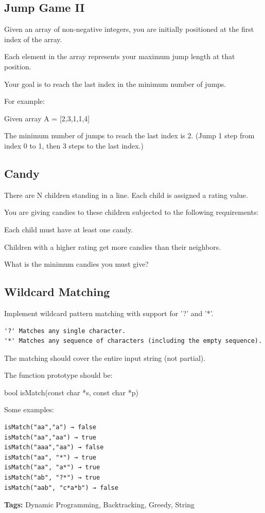 \documentclass[12pt]{book}
\begin{document}
\subsection{Jump Game II}
\label{sec-13-2-1}
Given an array of non-negative integers, you are initially positioned at the first index of the array.

Each element in the array represents your maximum jump length at that position.

Your goal is to reach the last index in the minimum number of jumps.

For example:

Given array A = [2,3,1,1,4]

The minimum number of jumps to reach the last index is 2. (Jump 1 step from index 0 to 1, then 3 steps to the last index.)
\subsection{Candy}
\label{sec-13-2-2}
There are N children standing in a line. Each child is assigned a rating value.

You are giving candies to these children subjected to the following requirements:

Each child must have at least one candy.

Children with a higher rating get more candies than their neighbors.

What is the minimum candies you must give?
\subsection{Wildcard Matching}
\label{sec-13-2-3}
Implement wildcard pattern matching with support for '?' and '*'.
\lstset{language=java,label= ,caption= ,numbers=none}
\begin{lstlisting}
'?' Matches any single character.
'*' Matches any sequence of characters (including the empty sequence).
\end{lstlisting}

The matching should cover the entire input string (not partial).

The function prototype should be:

bool isMatch(const char *s, const char *p)

Some examples:
\lstset{language=java,label= ,caption= ,numbers=none}
\begin{lstlisting}
isMatch("aa","a") → false
isMatch("aa","aa") → true
isMatch("aaa","aa") → false
isMatch("aa", "*") → true
isMatch("aa", "a*") → true
isMatch("ab", "?*") → true
isMatch("aab", "c*a*b") → false
\end{lstlisting}
\textbf{Tags:} Dynamic Programming, Backtracking, Greedy, String
\end{document}
